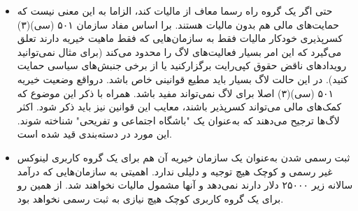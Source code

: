 \begin{itemize}
\item
حتی اگر  یک گروه راه رسما معاف از مالیات کند، الزاما به این معنی نیست
که حمایت‌های مالی هم بدون مالیات هستند. برا اساس مفاد سازمان ۵۰۱ (سی)(۳) کسرپذیری
خودکار مالیات فقط به سازمان‌هایی که فقط ماهیت خیریه دارند تعلق می‌گیرد که این امر
بسیار فعالیت‌های لاگ را محدود می‌کند (برای مثال نمی‌توانید رویدادهای ناقض حقوق کپی‌رایت
برگزارکنید یا از برخی جنبش‌های سیاسی حمایت کنید). در این حالت لاگ بسیار باید مطیع قوانینی
خاص باشد. درواقع وضعیت خیریه ۵۰۱ (سی)(۳) اصلا برای لاگ نمی‌تواند مفید باشد.
همراه با ذکر این موضوع که کمک‌های مالی می‌تواند کسرپذیر باشند، معایب این قوانین نیز
باید ذکر شود. اکثر لاگ‌ها ترجیح می‌دهند که به‌عنوان یک "باشگاه اجتماعی و تفریحی" شناخته شوند.
این مورد در دسته‌بندی
قید شده است.

\item
ثبت رسمی شدن به‌عنوان یک سازمان خیریه آن هم برای یک گروه کاربری لینوکس غیر رسمی و کوچک
هیچ توجیه و دلیلی ندارد.  اهمیتی به سازمان‌هایی که درآمد سالانه زیر ۲۵۰۰۰ دلار دارند نمی‌دهد
و آنها مشمول مالیات نخواهند شد. از همین رو برای یک گروه کاربری کوچک هیچ نیازی به ثبت رسمی نخواهد بود.


\end{itemize}
